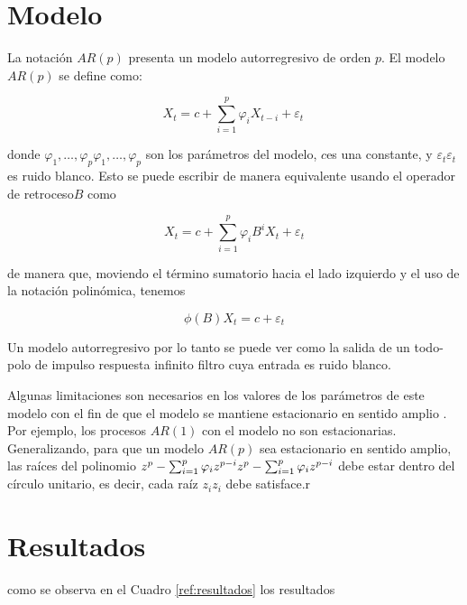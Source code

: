 \section{Modelo}
La notación $AR(p)$ presenta un modelo autorregresivo de orden $p$. El modelo $AR(p)$ se define como:

$${\displaystyle X_{t}=c+\sum _{i=1}^{p}\varphi _{i}X_{t-i}+\varepsilon _{t}\,}$$

donde ${\displaystyle \varphi _{1},\ldots ,\varphi _{p}}{\displaystyle \varphi _{1},\ldots ,\varphi _{p}} $ son los parámetros del modelo, ${\displaystyle c} $es una constante, y ${\displaystyle \varepsilon _{t}}{\displaystyle \varepsilon _{t}}$ es ruido blanco. Esto se puede escribir de manera equivalente usando el operador de retroceso$B$ como

$$ {\displaystyle X_{t}=c+\sum _{i=1}^{p}\varphi _{i}B^{i}X_{t}+\varepsilon _{t}}$$

de manera que, moviendo el término sumatorio hacia el lado izquierdo y el uso de la notación polinómica, tenemos

$${\displaystyle \phi (B)X_{t}=c+\varepsilon _{t}}$$

Un modelo autorregresivo por lo tanto se puede ver como la salida de un todo- polo de impulso respuesta infinito filtro cuya entrada es ruido blanco.

Algunas limitaciones son necesarios en los valores de los parámetros de este modelo con el fin de que el modelo se mantiene estacionario en sentido amplio . Por ejemplo, los procesos $AR(1)$ con el modelo  no son estacionarias. Generalizando, para que un modelo $AR(p)$ sea estacionario en sentido amplio, las raíces del polinomio ${\displaystyle \textstyle z^{p}-\sum _{i=1}^{p}\varphi _{i}z^{p-i}}{\displaystyle \textstyle z^{p}-\sum _{i=1}^{p}\varphi _{i}z^{p-i}}$  debe estar dentro del círculo unitario, es decir, cada raíz ${\displaystyle z_{i}}{\displaystyle z_{i}} $ debe satisface.r



\section{Resultados}
como se observa en el Cuadro \ref{ref:resultados} los resultados 

